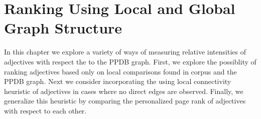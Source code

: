 \section{Ranking Using Local and Global Graph Structure}


In this chapter we explore a variety of ways of measuring relative intensities of adjectives with respect the to the PPDB graph. First, we explore the possiblity of ranking adjectives based only on local comparisons found in corpus and the PPDB graph. Next we consider incorporating the using local connectivity heuristic of adjectives in cases where no direct edges are observed. Finally, we generalize this heuristic by comparing the personalized page rank of adjectives with respect to each other.





